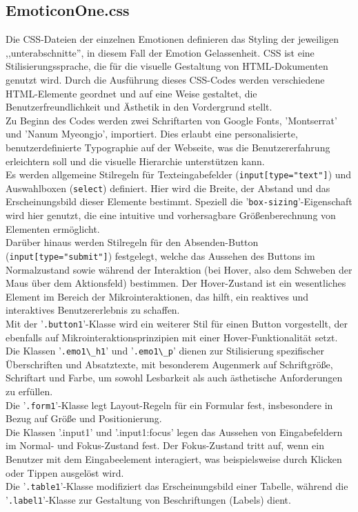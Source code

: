 \documentclass[./dokumentation.tex]{subfiles}
\begin{document}
\subsection{EmoticonOne.css}
Die CSS-Dateien der einzelnen Emotionen definieren das Styling der jeweiligen ,,unterabschnitte'', in diesem Fall der Emotion Gelassenheit. CSS ist eine Stilisierungssprache, die für die visuelle Gestaltung von HTML-Dokumenten genutzt wird. Durch die Ausführung dieses CSS-Codes werden verschiedene HTML-Elemente geordnet und auf eine Weise gestaltet, die Benutzerfreundlichkeit und Ästhetik in den Vordergrund stellt.\\
Zu Beginn des Codes werden zwei Schriftarten von Google Fonts, 'Montserrat' und 'Nanum Myeongjo', importiert. Dies erlaubt eine personalisierte, benutzerdefinierte Typographie auf der Webseite, was die Benutzererfahrung erleichtern soll und die visuelle Hierarchie unterstützen kann.\\
Es werden allgemeine Stilregeln für Texteingabefelder (\verb+input[type="text"]+) und Auswahlboxen (\verb+select+) definiert. Hier wird die Breite, der Abstand und das Erscheinungsbild dieser Elemente bestimmt. Speziell die '\verb+box-sizing+'-Eigenschaft wird hier genutzt, die eine intuitive und vorhersagbare Größenberechnung von Elementen ermöglicht.\\
Darüber hinaus werden Stilregeln für den Absenden-Button (\verb+input[type="submit"]+) festgelegt, welche das Aussehen des Buttons im Normalzustand sowie während der Interaktion (bei Hover, also dem Schweben der Maus über dem Aktionsfeld) bestimmen. Der Hover-Zustand ist ein wesentliches Element im Bereich der Mikrointeraktionen, das hilft, ein reaktives und interaktives Benutzererlebnis zu schaffen.\\
Mit der '\verb+.button1+'-Klasse wird ein weiterer Stil für einen Button vorgestellt, der ebenfalls auf Mikrointeraktionsprinzipien mit einer Hover-Funktionalität setzt.\\
Die Klassen '\verb+.emo1\_h1+' und '\verb+.emo1\_p+' dienen zur Stilisierung spezifischer Überschriften und Absatztexte, mit besonderem Augenmerk auf Schriftgröße, Schriftart und Farbe, um sowohl Lesbarkeit als auch ästhetische Anforderungen zu erfüllen.\\
Die '\verb+.form1+'-Klasse legt Layout-Regeln für ein Formular fest, insbesondere in Bezug auf Größe und Positionierung.\\
Die Klassen '.input1' und '.input1:focus' legen das Aussehen von Eingabefeldern im Normal- und Fokus-Zustand fest. Der Fokus-Zustand tritt auf, wenn ein Benutzer mit dem Eingabeelement interagiert, was beispielsweise durch Klicken oder Tippen ausgelöst wird. \\
Die '\verb+.table1+'-Klasse modifiziert das Erscheinungsbild einer Tabelle, während die '\verb+.label1+'-Klasse zur Gestaltung von Beschriftungen (Labels) dient.\\
\end{document}
